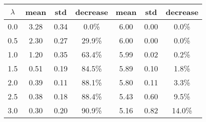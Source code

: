 \begin{tabular}{c||c|c|c||c|c|c}
\toprule
 $\lambda$ &  mean &  std & decrease &  mean &  std & decrease \\
\midrule
       0.0 &  3.28 & 0.34 &    0.0\% &  6.00 & 0.00 &    0.0\% \\
       0.5 &  2.30 & 0.27 &   29.9\% &  6.00 & 0.00 &    0.0\% \\
       1.0 &  1.20 & 0.35 &   63.4\% &  5.99 & 0.02 &    0.2\% \\
       1.5 &  0.51 & 0.19 &   84.5\% &  5.89 & 0.10 &    1.8\% \\
       2.0 &  0.39 & 0.11 &   88.1\% &  5.80 & 0.11 &    3.3\% \\
       2.5 &  0.38 & 0.18 &   88.4\% &  5.43 & 0.60 &    9.5\% \\
       3.0 &  0.30 & 0.20 &   90.9\% &  5.16 & 0.82 &   14.0\% \\
\bottomrule
\end{tabular}
